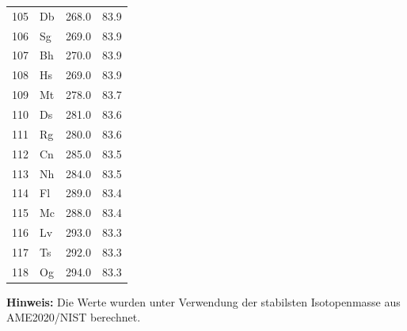 \documentclass[11pt,a4paper]{article}
\begin{document}
\begin{longtable}{c l c c}
		105& Db  & 268.0  & 83.9 \\
		106& Sg  & 269.0  & 83.9 \\
		107& Bh  & 270.0  & 83.9 \\
		108& Hs  & 269.0  & 83.9 \\
		109& Mt  & 278.0  & 83.7 \\
		110& Ds  & 281.0  & 83.6 \\
		111& Rg  & 280.0  & 83.6 \\
		112& Cn  & 285.0  & 83.5 \\
		113& Nh  & 284.0  & 83.5 \\
		114& Fl  & 289.0  & 83.4 \\
		115& Mc  & 288.0  & 83.4 \\
		116& Lv  & 293.0  & 83.3 \\
		117& Ts  & 292.0  & 83.3 \\
		118& Og  & 294.0  & 83.3 \\
		\bottomrule
	\end{longtable}
	\vspace{0.5cm}
	\noindent
	\textbf{Hinweis:} Die Werte wurden unter Verwendung der stabilsten Isotopenmasse aus AME2020/NIST berechnet.
	
\end{document}
